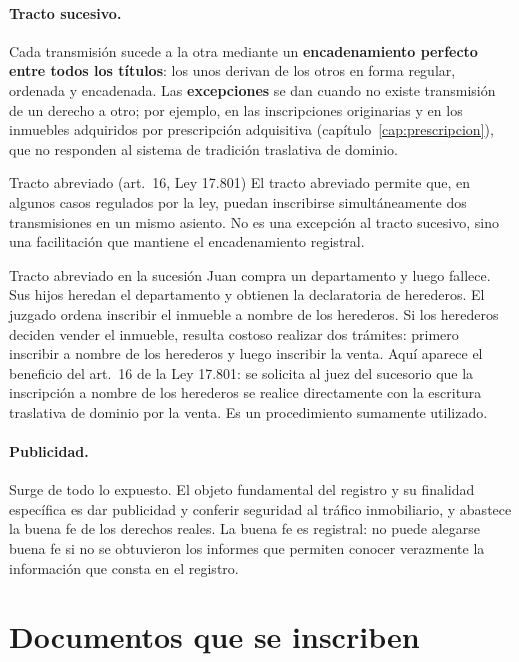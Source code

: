 \documentclass[12pt,oneside]{book}
\begin{document}
\paragraph{Tracto sucesivo.} Cada transmisión sucede a la otra mediante un \textbf{encadenamiento perfecto entre todos los títulos}: los unos derivan de los otros en forma regular, ordenada y encadenada. Las \textbf{excepciones} se dan cuando no existe transmisión de un derecho a otro; por ejemplo, en las inscripciones originarias y en los inmuebles adquiridos por prescripción adquisitiva (capítulo~\ref{cap:prescripcion}), que no responden al sistema de tradición traslativa de dominio.

\begin{regla}{Tracto abreviado (art.~16, Ley 17.801)}
El tracto abreviado permite que, en algunos casos regulados por la ley, puedan inscribirse simultáneamente dos transmisiones en un mismo asiento. No es una excepción al tracto sucesivo, sino una facilitación que mantiene el encadenamiento registral.
\end{regla}

\begin{ejemplo}{Tracto abreviado en la sucesión}
Juan compra un departamento y luego fallece. Sus hijos heredan el departamento y obtienen la declaratoria de herederos. El juzgado ordena inscribir el inmueble a nombre de los herederos. Si los herederos deciden vender el inmueble, resulta costoso realizar dos trámites: primero inscribir a nombre de los herederos y luego inscribir la venta. Aquí aparece el beneficio del art.~16 de la Ley 17.801: se solicita al juez del sucesorio que la inscripción a nombre de los herederos se realice directamente con la escritura traslativa de dominio por la venta. Es un procedimiento sumamente utilizado.
\end{ejemplo}

\paragraph{Publicidad.} Surge de todo lo expuesto. El objeto fundamental del registro y su finalidad específica es dar publicidad y conferir seguridad al tráfico inmobiliario, y abastece la buena fe de los derechos reales. La buena fe es registral: no puede alegarse buena fe si no se obtuvieron los informes que permiten conocer verazmente la información que consta en el registro.

\section{Documentos que se inscriben}
\end{document}
